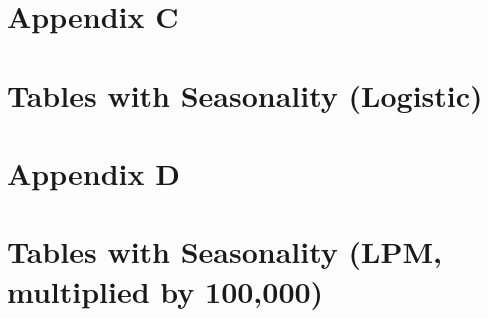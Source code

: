 \vfill
\eject














\clearpage
\pagebreak

\section*{Appendix C}
\vspace{3.0in}

\section*{Tables with Seasonality (Logistic)}
\label{sec:Appendix}

\vfill
\eject












\clearpage
\pagebreak

\section*{Appendix D}
\vspace{3.0in}

\section*{Tables with Seasonality (LPM, multiplied by 100,000)}
\label{sec:Appendix}

\vfill
\eject













